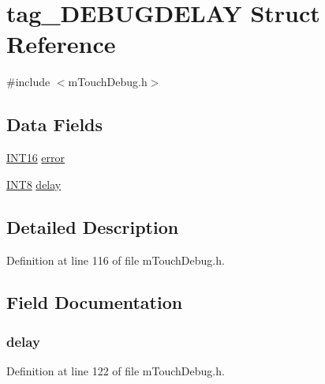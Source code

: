 \hypertarget{structtag___d_e_b_u_g_d_e_l_a_y}{}\section{tag\+\_\+\+D\+E\+B\+U\+G\+D\+E\+L\+A\+Y Struct Reference}
\label{structtag___d_e_b_u_g_d_e_l_a_y}


{\ttfamily \#include $<$m\+Touch\+Debug.\+h$>$}

\subsection*{Data Fields}
\begin{DoxyCompactItemize}
\item 
\hyperlink{_generic_type_defs_8h_ad87465075f24df28ef66f25e43f0bd5a}{I\+N\+T16} \hyperlink{structtag___d_e_b_u_g_d_e_l_a_y_a2c336ec489f664295b2020b126f23ed4}{error}
\item 
\hyperlink{_generic_type_defs_8h_a7ebe70ceca856797319175e30bcf003d}{I\+N\+T8} \hyperlink{structtag___d_e_b_u_g_d_e_l_a_y_a23bd48fad562fbcbde69663308d2ec65}{delay}
\end{DoxyCompactItemize}


\subsection{Detailed Description}


Definition at line 116 of file m\+Touch\+Debug.\+h.



\subsection{Field Documentation}
\hypertarget{structtag___d_e_b_u_g_d_e_l_a_y_a23bd48fad562fbcbde69663308d2ec65}{}
\subsubsection[{delay}]{ delay}\label{structtag___d_e_b_u_g_d_e_l_a_y_a23bd48fad562fbcbde69663308d2ec65}


Definition at line 122 of file m\+Touch\+Debug.\+h.

